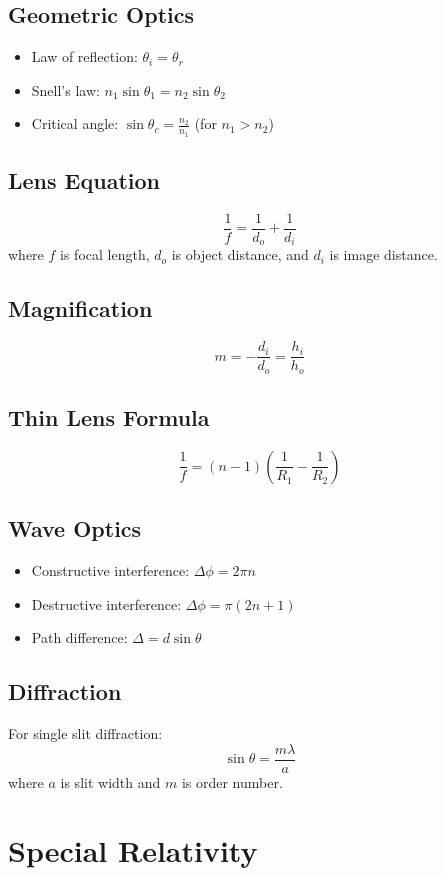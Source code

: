 \documentclass[11pt]{article}
\theoremstyle{definition}
\begin{document}
\subsection{Geometric Optics}
\begin{itemize}
    \item Law of reflection: $\theta_i = \theta_r$
    \item Snell's law: $n_1 \sin \theta_1 = n_2 \sin \theta_2$
    \item Critical angle: $\sin \theta_c = \frac{n_2}{n_1}$ (for $n_1 > n_2$)
\end{itemize}

\subsection{Lens Equation}
$$\frac{1}{f} = \frac{1}{d_o} + \frac{1}{d_i}$$
where $f$ is focal length, $d_o$ is object distance, and $d_i$ is image distance.

\subsection{Magnification}
$$m = -\frac{d_i}{d_o} = \frac{h_i}{h_o}$$

\subsection{Thin Lens Formula}
$$\frac{1}{f} = (n-1)\left(\frac{1}{R_1} - \frac{1}{R_2}\right)$$

\subsection{Wave Optics}
\begin{itemize}
    \item Constructive interference: $\Delta \phi = 2\pi n$
    \item Destructive interference: $\Delta \phi = \pi(2n+1)$
    \item Path difference: $\Delta = d\sin\theta$
\end{itemize}

\subsection{Diffraction}
For single slit diffraction:
$$\sin \theta = \frac{m\lambda}{a}$$
where $a$ is slit width and $m$ is order number.

\section{Special Relativity}
\end{document}
